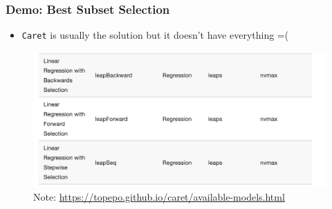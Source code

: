 \documentclass[
  shownotes,
  xcolor={svgnames},
  hyperref={colorlinks,citecolor=DarkBlue,linkcolor=DarkRed,urlcolor=DarkBlue}
  , aspectratio=169]{beamer}
\begin{document}
\begin{frame}[fragile]
\frametitle{Demo: Best Subset Selection}
\begin{itemize}
 \item \texttt{Caret} is usually the solution but it doesn't have everything =(
\end{itemize}
 \begin{figure}[H] \centering
            \captionsetup{justification=centering}
              \includegraphics[scale=0.3]{figures/caret_leaps}
\\
\flushleft
              \scriptsize
              Note: \url{https://topepo.github.io/caret/available-models.html}
 \end{figure}


\end{frame}
\end{document}
